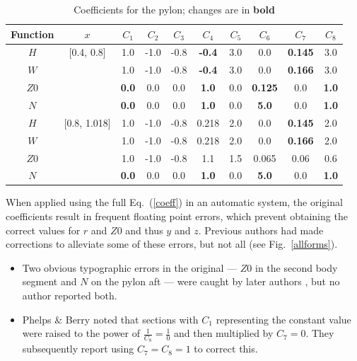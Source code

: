 \documentclass[journal]{new-aiaa}
\begin{document}
\begin{table}[!h]
\caption{Coefficients for the pylon; changes are in \textbf{bold}}
\centering
\begin{tabular}{cccccccccc}
Function & $x$ & $C_{1}$ & $C_{2}$ & $C_{3}$ & $C_{4}$ & $C_{5}$ & $C_{6}$ & $C_{7}$ & $C_{8}$ \\
\hline
$H$          & [0.4, 0.8]  & 1.0             & -1.0 & -0.8 & \textbf{-0.4} & 3.0 & 0.0                  & \textbf{0.145} & 3.0 \\
$W$          &                 & 1.0             & -1.0 & -0.8 & \textbf{-0.4} & 3.0 & 0.0                  & \textbf{0.166} & 3.0 \\
$Z0$ &                 & \textbf{0.0} & 0.0  & 0.0  & \textbf{1.0}  & 0.0  & \textbf{0.125} & 0.0                 & \textbf{1.0} \\
$N$           &                 & \textbf{0.0} & 0.0  & 0.0  & \textbf{1.0}  & 0.0  & \textbf{5.0}     & 0.0                 & \textbf{1.0} \\
\hline
$H$          & [0.8, 1.018]  & 1.0             & -1.0 & -0.8 & 0.218         & 2.0 & 0.0                 & \textbf{0.145} & 2.0 \\
$W$          &                     & 1.0             & -1.0 & -0.8 & 0.218         & 2.0 & 0.0                 & \textbf{0.166} & 2.0 \\
$Z0$ &                     & 1.0             & -1.0 & -0.8 & 1.1             & 1.5 & 0.065             & 0.06               & 0.6 \\
$N$           &                     & \textbf{0.0} & 0.0  & 0.0  & \textbf{1.0} & 0.0 & \textbf{5.0}     & 0.0                 & \textbf{1.0} \\
\end{tabular}
\label{pycoeff}
\end{table}

When applied using the full Eq.~(\ref{coeff}) in an automatic system, the original coefficients result in
frequent floating point errors, which prevent obtaining the correct values for $r$ and $Z0$ and thus $y$ and $z$.
Previous authors had made corrections to alleviate some of these errors, but not all (see Fig.~\ref{allforms}).
\begin{itemize}
\item Two obvious typographic errors in the original \cite{nasa80051} --- $Z0$ in the second body segment and $N$
on the pylon aft --- were caught by later authors \cite{nasa87762,mineckgorton}, but no author reported both.
\item Phelps \& Berry \cite{nasa87762} noted that sections with $C_1$ representing the constant value were raised
to the power of $\frac{1}{C_8} = \frac{1}{0}$ and then multiplied by $C_7 = 0$. They subsequently report using
$C_7 = C_8 = 1$ to correct this.
\end{itemize}
\end{document}
